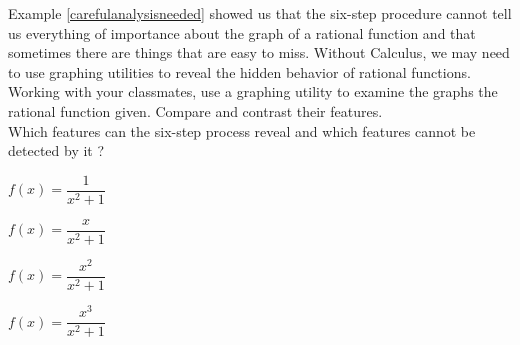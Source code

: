 \documentclass{ximera}
\begin{document}
\begin{problem} %
  Example \ref{carefulanalysisneeded} showed us that the six-step procedure cannot tell us everything of importance about the graph of a rational function and that sometimes there are things that are easy to miss.  Without Calculus, we may need to use graphing utilities to reveal the hidden behavior of rational functions.  Working with your classmates, use a graphing utility to examine the graphs the rational function given.  Compare and contrast their features. 
  \\ 
  Which features can the six-step process reveal and which features cannot be detected by it ?   

  \begin{question} $f(x) = \dfrac{1}{x^{2} + 1}$     \end{question} 

  \begin{question} $f(x) = \dfrac{x}{x^{2} + 1}$     \end{question} 

  \begin{question} $f(x) = \dfrac{x^{2}}{x^{2} + 1}$ \end{question}

  \begin{question} $f(x) = \dfrac{x^{3}}{x^{2} + 1}$ \end{question} 

\end{problem}
\end{document}
